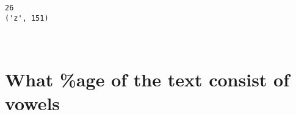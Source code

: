 \documentclass[11pt]{article}
\begin{document}
    \begin{Verbatim}[commandchars=\\\{\}]
26
('z', 151)
    \end{Verbatim}

    \begin{center}
    \end{center}
    { \hspace*{\fill} \\}
    
    \hypertarget{what-age-of-the-text-consist-of-vowels}{%
\section{What \%age of the text consist of
vowels}\label{what-age-of-the-text-consist-of-vowels}}
\end{document}
